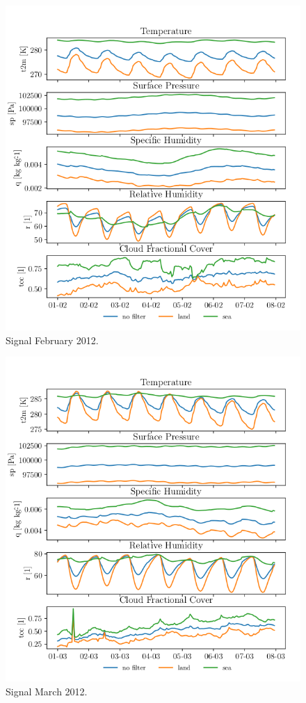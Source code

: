 \begin{figure}[ht]
    \centering
    \includegraphics{python_figs/spatially_averaged_one_week_from_2012-02-01.png}
    \caption{Signal February 2012.}
    \label{fig:feb12}
\end{figure}
\begin{figure}[ht]
    \centering
    \includegraphics{python_figs/spatially_averaged_one_week_from_2012-03-01.png}
    \caption{Signal March 2012.}
    \label{fig:mar12}
\end{figure}
